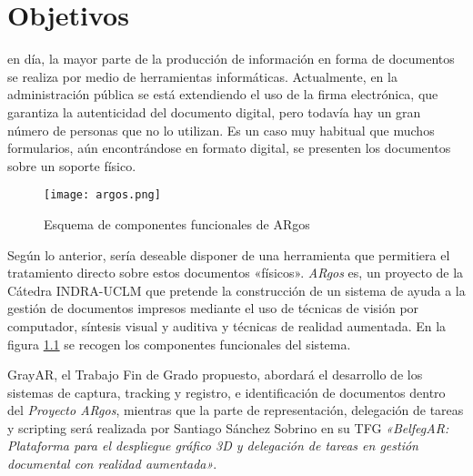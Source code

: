 \chapter{Objetivos}
\label{chap:objetivos}

 en día, la mayor parte de la producción de información en forma de documentos se realiza por medio de herramientas informáticas. Actualmente, en la administración pública se está extendiendo el uso de la firma electrónica, que garantiza la autenticidad del documento digital, pero todavía hay un gran número de personas que no lo utilizan. Es un caso muy habitual que muchos formularios, aún encontrándose en formato digital, se presenten los documentos sobre un soporte físico. %
\begin{figure}[h!]
  \begin{center}
      \texttt{[image: argos.png]}
      \caption{Esquema de componentes funcionales de ARgos}
      \label{fig:diagrama_argos}
    \end{center}
\end{figure}
   
Según lo anterior, sería deseable disponer de una herramienta que permitiera el tratamiento directo sobre estos documentos «físicos». \textit{ARgos} es, un proyecto de la Cátedra INDRA-UCLM que pretende la construcción de un sistema de ayuda a la gestión de documentos impresos mediante el uso de técnicas de visión por computador, síntesis visual y auditiva y técnicas de realidad aumentada. En la figura \ref{fig:diagrama_argos} se recogen los componentes funcionales del sistema.

GrayAR, el Trabajo Fin de Grado propuesto, abordará el desarrollo de los sistemas de captura, tracking y registro, e identificación de documentos dentro del \textit{Proyecto ARgos}, mientras que la parte de representación, delegación de tareas y scripting será realizada por Santiago Sánchez Sobrino en su TFG \textit{«BelfegAR: Plataforma para el despliegue gráfico 3D y delegación de tareas en gestión documental con realidad aumentada»}. 

